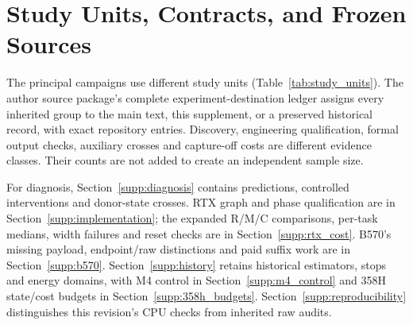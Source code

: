 \section{Study Units, Contracts, and Frozen Sources}
\label{supp:scope}
The principal campaigns use different study units (Table~\ref{tab:study_units}). The author source package's complete experiment-destination ledger assigns every inherited group to the main text, this supplement, or a preserved historical record, with exact repository entries. Discovery, engineering qualification, formal output checks, auxiliary crosses and capture-off costs are different evidence classes. Their counts are not added to create an independent sample size.

For diagnosis, Section~\ref{supp:diagnosis} contains predictions, controlled interventions and donor-state crosses. RTX graph and phase qualification are in Section~\ref{supp:implementation}; the expanded R/M/C comparisons, per-task medians, width failures and reset checks are in Section~\ref{supp:rtx_cost}. B570's missing payload, endpoint/raw distinctions and paid suffix work are in Section~\ref{supp:b570}. Section~\ref{supp:history} retains historical estimators, stops and energy domains, with M4 control in Section~\ref{supp:m4_control} and 358H state/cost budgets in Section~\ref{supp:358h_budgets}. Section~\ref{supp:reproducibility} distinguishes this revision's CPU checks from inherited raw audits.

